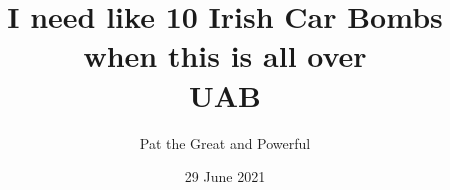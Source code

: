 \title{
{I need like 10 Irish Car Bombs when this is all over}\\
{UAB}\\
}
\author{Pat the Great and Powerful}
\date{29 June 2021}
\maketitle